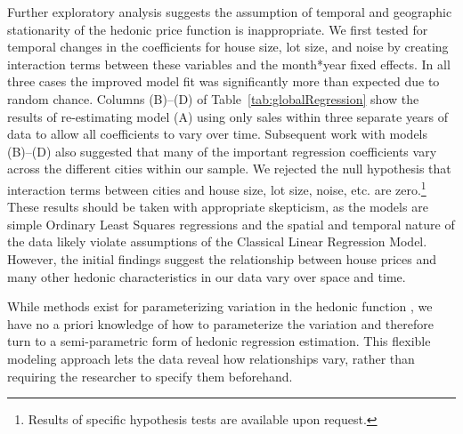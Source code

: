 \documentclass{article}\usepackage[]{graphicx}\usepackage[]{color}
\begin{document}
Further exploratory analysis suggests the assumption of temporal and geographic stationarity of the hedonic price function is inappropriate. We first tested for temporal changes in the coefficients for house size, lot size, and noise by creating interaction terms between these variables and the month*year fixed effects. In all three cases the improved model fit was significantly more than expected due to random chance. Columns (B)--(D) of Table~\ref{tab:globalRegression} show the results of re-estimating model (A) using only sales within three separate years of data to allow all coefficients to vary over time. Subsequent work with models (B)--(D) also suggested that many of the important regression coefficients vary across the different cities within our sample. We rejected the null hypothesis that interaction terms between cities and house size, lot size, noise, etc. are zero.\footnote{Results of specific hypothesis tests are available upon request.}  These results should be taken with appropriate skepticism, as the models are simple Ordinary Least Squares regressions and the spatial and temporal nature of the data likely violate assumptions of the Classical Linear Regression Model. However, the initial findings suggest the relationship between house prices and many other hedonic characteristics in our data vary over space and time. 

While methods exist for parameterizing variation in the hedonic function \citep[such as spatial expansion as suggested by][]{Casetti1972}, we have no a priori knowledge of how to parameterize the variation and therefore turn to a semi-parametric form of hedonic regression estimation. This flexible modeling approach lets the data reveal how relationships vary, rather than requiring the researcher to specify them beforehand. 
\end{document}
